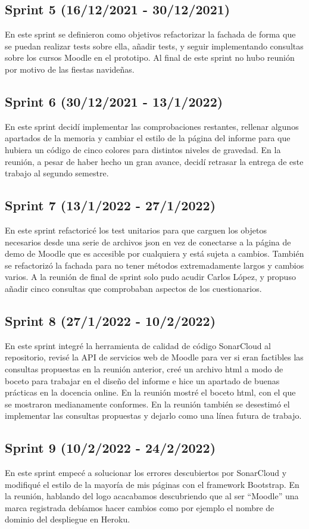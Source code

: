 \subsection{Sprint 5 (16/12/2021 - 30/12/2021)}
	En este sprint se definieron como objetivos refactorizar la fachada de forma que se puedan realizar tests sobre ella, añadir tests, y seguir implementando consultas sobre los cursos Moodle en el prototipo. Al final de este sprint no hubo reunión por motivo de las fiestas navideñas.
\subsection{Sprint 6 (30/12/2021 - 13/1/2022)}
	En este sprint decidí implementar las comprobaciones restantes, rellenar algunos apartados de la memoria y cambiar el estilo de la página del informe para que hubiera un código de cinco colores para distintos niveles de gravedad. En la reunión, a pesar de haber hecho un gran avance, decidí retrasar la entrega de este trabajo al segundo semestre.
\subsection{Sprint 7 (13/1/2022 - 27/1/2022)}
	En este sprint refactoricé los test unitarios para que carguen los objetos necesarios desde una serie de archivos json en vez de conectarse a la página de demo de Moodle que es accesible por cualquiera y está sujeta a cambios. También se refactorizó la fachada para no tener métodos extremadamente largos y cambios varios. A la reunión de final de sprint solo pudo acudir Carlos López, y propuso añadir cinco consultas que comprobaban aspectos de los cuestionarios.
\subsection{Sprint 8 (27/1/2022 - 10/2/2022)}
	En este sprint integré la herramienta de calidad de código SonarCloud al repositorio, revisé la API de servicios web de Moodle para ver si eran factibles las consultas propuestas en la reunión anterior, creé un archivo html a modo de boceto para trabajar en el diseño del informe e hice un apartado de buenas prácticas en la docencia online. En la reunión mostré el boceto html, con el que se mostraron medianamente conformes. En la reunión también se desestimó el implementar las consultas propuestas y dejarlo como una línea futura de trabajo.
\subsection{Sprint 9 (10/2/2022 - 24/2/2022)}
	En este sprint empecé a solucionar los errores descubiertos por SonarCloud y modifiqué el estilo de la mayoría de mis páginas con el framework Bootstrap. En la reunión, hablando del logo acacabamos descubriendo que al ser ``Moodle'' una marca registrada debíamos hacer cambios como por ejemplo el nombre de dominio del despliegue en Heroku.
